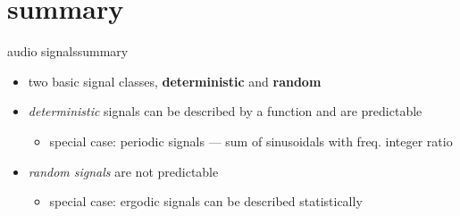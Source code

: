 \section{summary}
    \begin{frame}{audio signals}{summary}
        \begin{itemize}
            \item   two basic signal classes, \textbf{deterministic} and \textbf{random}
            \bigskip
            \item   \textit{deterministic} signals can be described by a function and are predictable
                \begin{itemize}
                    \item   special case: periodic signals --- sum of sinusoidals with freq. integer ratio
                \end{itemize}
            \bigskip
            \item   \textit{random signals} are not predictable
                \begin{itemize}
                    \item   special case: ergodic signals can be described statistically 
                \end{itemize}
        \end{itemize}
    \end{frame}
    



